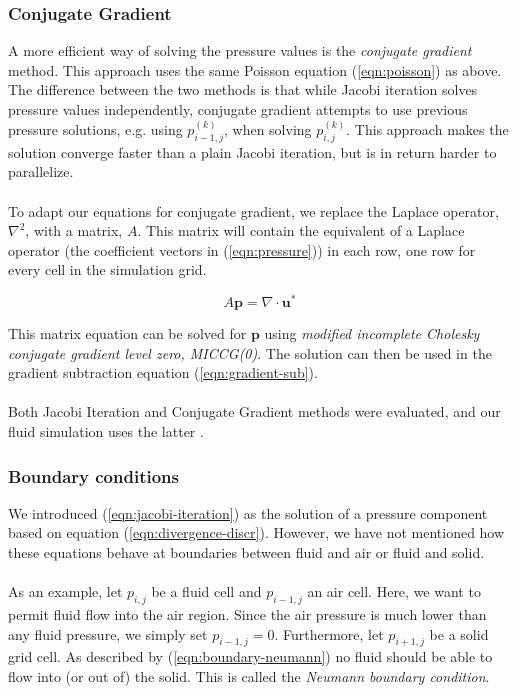 \documentclass[twocolumn]{article}
\begin{document}
\subsubsection{Conjugate Gradient}
A more efficient way of solving the pressure values is the \emph{conjugate gradient} method. This approach uses the same Poisson equation (\ref{eqn:poisson}) as above. The difference between the two methods is that while Jacobi iteration solves pressure values independently, conjugate gradient attempts to use previous pressure solutions, e.g. using $p_{i-1, j}^{(k)}$, when solving $p_{i, j}^{(k)}$. This approach makes the solution converge faster than a plain Jacobi iteration, but is in return harder to parallelize.
\\\\
To adapt our equations for conjugate gradient, we replace the Laplace operator, $\nabla^2$, with a matrix, $A$. This matrix will contain the equivalent of a Laplace operator (the coefficient vectors in (\ref{eqn:pressure})) in each row, one row for every cell in the simulation grid.

\begin{equation}
  A \mathbf{p} = \nabla \cdot \mathbf{u}^*
\end{equation}

This matrix equation can be solved for $\mathbf{p}$ using \emph{modified incomplete Cholesky conjugate gradient level zero, MICCG(0)}\cite{fluidBook}. The solution can then be used in the gradient subtraction equation (\ref{eqn:gradient-sub}).
\\\\
Both Jacobi Iteration and Conjugate Gradient methods were evaluated, and our fluid simulation uses the latter .


\subsubsection{Boundary conditions}
We introduced (\ref{eqn:jacobi-iteration}) as the solution of a pressure component based on equation (\ref{eqn:divergence-discr}). However, we have not mentioned how these equations behave at boundaries between fluid and air or fluid and solid.
\\\\
As an example, let $p_{i, j}$ be a fluid cell and $p_{i-1, j}$ an air cell. Here, we want to permit fluid flow into the air region. Since the air pressure is much lower than any fluid pressure, we simply set $p_{i-1, j} = 0$. Furthermore, let $p_{i+1, j}$ be a solid grid cell. As described by (\ref{eqn:boundary-neumann}) no fluid should be able to flow into (or out of) the solid. This is called the \emph{Neumann boundary condition}.
\end{document}
